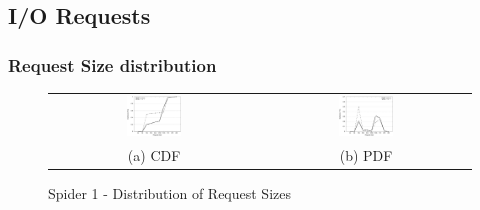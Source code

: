 \subsection{I/O Requests}
\subsubsection{Request Size distribution}



\begin{figure}[!t]
\begin{center}
\begin{tabular}{cc}
\hspace*{-1cm}                                                           
{\includegraphics[width=0.27\textwidth]{./figs/spider1-reqSizeCDF.eps}}&
\hspace{-2mm}
{\includegraphics[width=0.27\textwidth]{./figs/spider1-reqSizePDF.eps}}\\
\small (a) CDF & \small(b) PDF \\
\end{tabular}
\vspace{-0.1in}
\captionsetup{justification=centering}
\caption{Spider 1 - Distribution of Request Sizes}
\label{fig:spider1-reqsizedist}
\end{center}
\end{figure}

